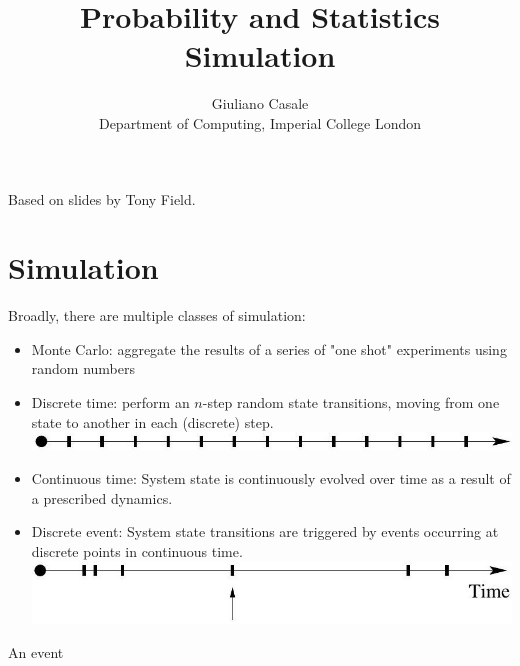 \documentclass[10pt]{article}
\title{Probability and Statistics \\
 Simulation }
\author{Giuliano Casale\\
Department of Computing, Imperial College London}
\date{}
\begin{document}
\maketitle
Based on slides by Tony Field.

\section*{Simulation}
Broadly, there are multiple classes of simulation:

\begin{itemize}
  \item Monte Carlo: aggregate the results of a series of "one shot" experiments using random numbers
  \item Discrete time: perform an $n$-step random state transitions, moving from one state to another in each (discrete) step.\\
\includegraphics[max width=\textwidth, center]{2025_05_12_520db7cd238ba7b44f0fg-02(1)}
  \item Continuous time: System state is continuously evolved over time as a result of a prescribed dynamics.
  \item Discrete event: System state transitions are triggered by events occurring at discrete points in continuous time.\\
\includegraphics[max width=\textwidth, center]{2025_05_12_520db7cd238ba7b44f0fg-02}
\end{itemize}

An event
\end{document}
